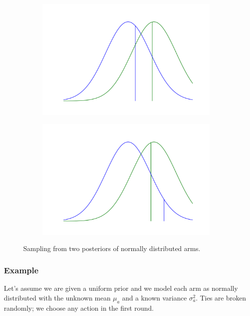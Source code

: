 \documentclass[12pt, a4paper, pdflatex, leqno, twoside]{report}
\begin{document}
\begin{figure}[htbp]
\centering
  \begin{subfigure}[b]{0.49\textwidth}
    \centering
    \includegraphics[width=0.99\linewidth]{graphics/sim1.png}
    \caption{\label{fig:sim1}}
  \end{subfigure}
  \begin{subfigure}[b]{0.49\textwidth}
    \centering
    \includegraphics[width=0.99\linewidth]{graphics/sim2.png}
    \caption{\label{fig:sim2}}
  \end{subfigure}
\begin{tiny}
\caption{Sampling from two posteriors of normally distributed 
arms.\label{fig:sim}}
\end{tiny}
\vspace{1cm}
\end{figure}


\subsubsection{Example}
Let's assume we are given a uniform prior and we model each arm as normally 
distributed with the unknown mean $\mu_a$ and a known variance $\sigma^2_a$. Ties are 
broken randomly; we choose any action in the first round.\\
\end{document}
